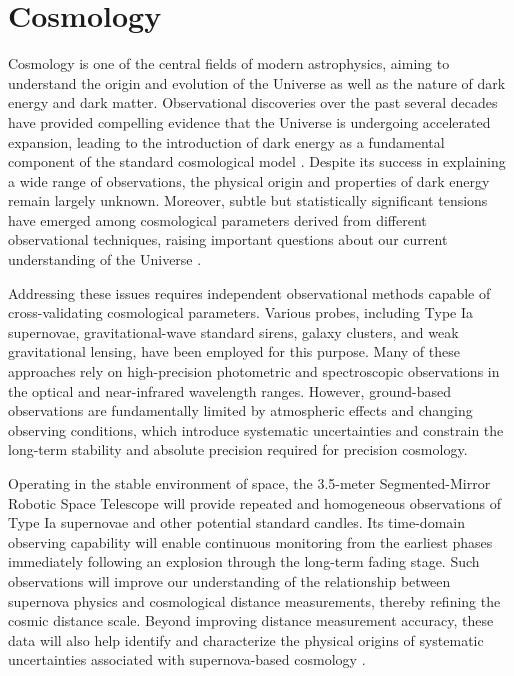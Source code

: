\section{Cosmology}

Cosmology is one of the central fields of modern astrophysics, aiming to understand the origin and evolution of the Universe as well as the nature of dark energy and dark matter. Observational discoveries over the past several decades have provided compelling evidence that the Universe is undergoing accelerated expansion, leading to the introduction of dark energy as a fundamental component of the standard cosmological model \cite{riess98,perlmutter99,planck2020}. Despite its success in explaining a wide range of observations, the physical origin and properties of dark energy remain largely unknown. Moreover, subtle but statistically significant tensions have emerged among cosmological parameters derived from different observational techniques, raising important questions about our current understanding of the Universe \cite{riess98,planck2020}.

Addressing these issues requires independent observational methods capable of cross-validating cosmological parameters. Various probes, including Type Ia supernovae, gravitational-wave standard sirens, galaxy clusters, and weak gravitational lensing, have been employed for this purpose. Many of these approaches rely on high-precision photometric and spectroscopic observations in the optical and near-infrared wavelength ranges. However, ground-based observations are fundamentally limited by atmospheric effects and changing observing conditions, which introduce systematic uncertainties and constrain the long-term stability and absolute precision required for precision cosmology.

Operating in the stable environment of space, the 3.5-meter Segmented-Mirror Robotic Space Telescope will provide repeated and homogeneous observations of Type Ia supernovae and other potential standard candles. Its time-domain observing capability will enable continuous monitoring from the earliest phases immediately following an explosion through the long-term fading stage. Such observations will improve our understanding of the relationship between supernova physics and cosmological distance measurements, thereby refining the cosmic distance scale. Beyond improving distance measurement accuracy, these data will also help identify and characterize the physical origins of systematic uncertainties associated with supernova-based cosmology \cite{riess98,perlmutter99}.

